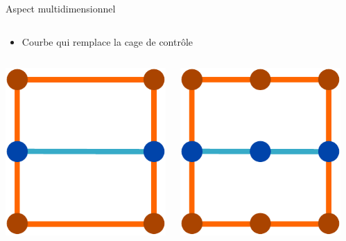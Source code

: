 \documentclass[xcolor=x11names,compress]{beamer}
\renewcommand{\(}{\begin{columns}} \renewcommand{\)}{\end{columns}}
\newcommand{\<}[1]{\begin{column}{#1}} \renewcommand{\>}{\end{column}}
\begin{document}
\begin{frame}{Aspect multidimensionnel}
\begin{columns}[t]
\begin{column}{0.3\textwidth}
    \end{column}
  \end{columns}
  \begin{itemize}
    \item Courbe qui remplace la cage de contrôle
  \end{itemize}
  \begin{columns}[t]
    \begin{column}{0.3\textwidth}
      \centering
      \includegraphics[scale=0.4]{OutilCourbe4}
    \end{column}
    \begin{column}{0.3\textwidth}
      \centering
      \includegraphics[scale=0.4]{OutilCourbe6}
    \end{column}
    \begin{column}{0.3\textwidth}
      \centering

\end{column}
\end{columns}
\end{frame}
\end{document}
